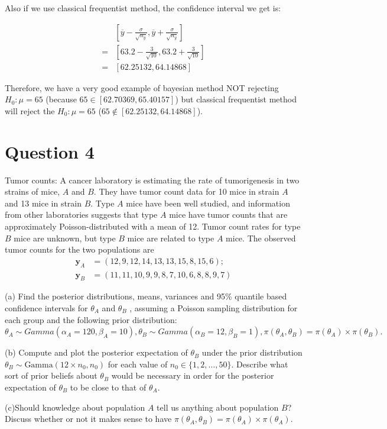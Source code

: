 \documentclass[11pt]{article}
\newcommand{\prob}[1]{
\begin{tcolorbox}[colback=green!5!white,colframe=green!75!black]
#1
\end{tcolorbox}
}
\begin{document}
Also if we use classical frequentist method, the confidence interval we get is:

\begin{align*}
& \left[\overline{y}-\frac{\sigma}{\sqrt{n_y}}, \overline{y}+\frac{\sigma}{\sqrt{n_y}} \right]\\
=& \left[63.2-\frac{3}{\sqrt{10}}, 63.2+\frac{3}{\sqrt{10}}\right]\\
=& \left[62.25132, 64.14868\right]
\end{align*}

Therefore, we have a very good example of bayesian method NOT rejecting $H_0: \mu = 65$ (because $65 \in [62.70369, 65.40157]$) but classical frequentist method will reject the $H_0: \mu = 65$ ($65 \notin \left[62.25132, 64.14868\right]$).

\section{Question 4}

\prob{
Tumor counts: A cancer laboratory is estimating the rate of tumorigenesis in two strains of mice, $A$ and $B$. They have tumor count data for 10 mice in strain $A$ and 13 mice in strain $B$. Type $A$ mice have been well studied, and information from other laboratories suggests that type $A$ mice have tumor counts that are approximately Poisson-distributed with a mean of 12. Tumor count rates for type $B$ mice are unknown, but type $B$ mice are related to type $A$ mice. The observed tumor counts for the two populations are
\begin{align*}
	\mathbf{y}_A &= (12, 9, 12, 14, 13, 13, 15, 8, 15, 6);\\
	\mathbf{y}_B &= (11, 11, 10, 9, 9, 8, 7, 10, 6, 8, 8, 9, 7)
\end{align*}


(a) Find the posterior distributions, means, variances and 95\% quantile based confidence intervals for $\theta_A$ and $\theta_B$ , assuming a Poisson sampling distribution for each group and the following prior distribution:
$\theta_A \sim Gamma(\alpha_A = 120, \beta_A=10), \theta_B \sim Gamma(\alpha_B = 12, \beta_B = 1), \pi(\theta_A, \theta_B ) = \pi(\theta_A)\times \pi(\theta_B).$

(b) Compute and plot the posterior expectation of $\theta_B$ under the prior distribution $\theta_B \sim \text{Gamma}(12\times n_0,n_0)$ for each value of $n_0 \in \{1,2,\ldots,50\}$. Describe what sort of prior beliefs about $\theta_B$ would be necessary in order for the posterior expectation of $\theta_B$ to be close to that of $\theta_A$. 

(c)Should knowledge about population $A$ tell us anything about population $B$? Discuss whether or not it makes sense to have $\pi(\theta_A, \theta_B) = \pi(\theta_A)\times \pi(\theta_A)$.
}
\end{document}
